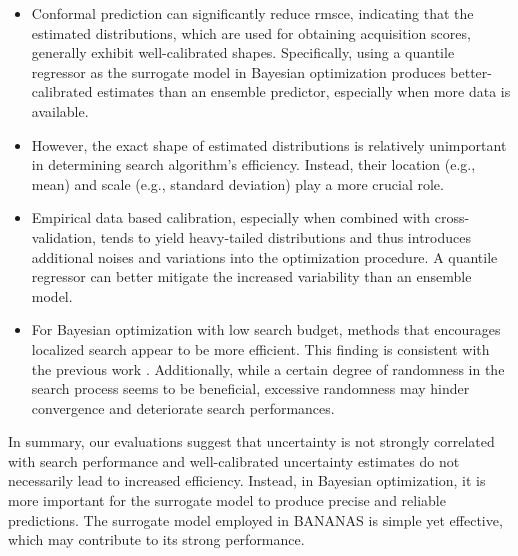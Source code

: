 \documentclass[a4paper,oneside,bibliography=totoc]{scrbook}
\begin{document}
\begin{itemize}
\item Conformal prediction can significantly reduce \gls{rmsce}, indicating that the estimated distributions, which are used for obtaining acquisition scores, generally exhibit well-calibrated shapes. Specifically, using a quantile regressor as the surrogate model in Bayesian optimization produces better-calibrated estimates than an ensemble predictor, especially when more data is available.
 
\item However, the exact shape of estimated distributions is relatively unimportant in determining search algorithm's efficiency. Instead, their location (e.g., mean) and scale (e.g., standard deviation) play a more crucial role. 

\item Empirical data based calibration, especially when combined with cross-validation, tends to yield heavy-tailed distributions and thus introduces additional noises and variations into the optimization procedure. A quantile regressor can better mitigate the increased variability than an ensemble model.

\item For Bayesian optimization with low search budget, methods that encourages localized search appear to be more efficient. This finding is consistent with the previous work \cite{nomura2019simple}. Additionally, while a certain degree of randomness in the search process seems to be beneficial, excessive randomness may hinder convergence and deteriorate search performances.
\end{itemize}

In summary, our evaluations suggest that uncertainty is not strongly correlated with  search performance and well-calibrated uncertainty estimates do not necessarily lead to increased efficiency. Instead, in Bayesian optimization, it is more important for the surrogate model to produce precise and reliable predictions. The surrogate model employed in BANANAS is simple yet effective, which may contribute to its strong performance. 
\end{document}
